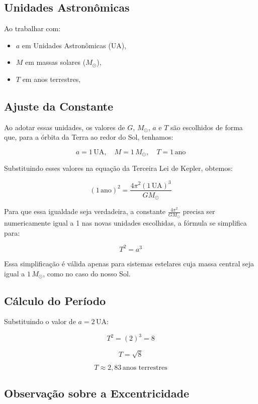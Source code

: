 \documentclass[a4paper,12pt]{article}
\begin{document}
\begin{flushleft}
\subsection*{Unidades Astronômicas}

Ao trabalhar com:

\begin{itemize}
    \item \( a \) em Unidades Astronômicas (UA),
    \item \( M \) em massas solares (\( M_{\odot} \)),
    \item \( T \) em anos terrestres,
\end{itemize}

\subsection*{Ajuste da Constante}

Ao adotar essas unidades, os valores de \(G\), \(M_{\odot}\), \(a\) e \(T\) são escolhidos de forma que, para a órbita da Terra ao redor do Sol, tenhamos:

\[
a = 1\,\text{UA}, \quad M = 1\,M_{\odot}, \quad T = 1\,\text{ano}
\]

Substituindo esses valores na equação da Terceira Lei de Kepler, obtemos:

\[
(1\,\text{ano})^2 = \frac{4\pi^2 (1\,\text{UA})^3}{G M_{\odot}}
\]

Para que essa igualdade seja verdadeira, a constante \(\frac{4\pi^2}{G M_{\odot}}\) precisa ser numericamente igual a 1 nas novas unidades escolhidas,
a fórmula se simplifica para:

\[
T^2 = a^3
\]

Essa simplificação é válida apenas para sistemas estelares cuja massa central seja igual a \(1\,M_{\odot}\), como no caso do nosso Sol.

\subsection*{Cálculo do Período}

Substituindo o valor de \(a = 2\,\text{UA}\):

\[
T^2 = (2)^3 = 8
\]

\[
T = \sqrt{8}
\]

\[
T \approx 2{,}83\,\text{anos terrestres}
\]

\subsection*{Observação sobre a Excentricidade}


\end{flushleft}
\end{document}
